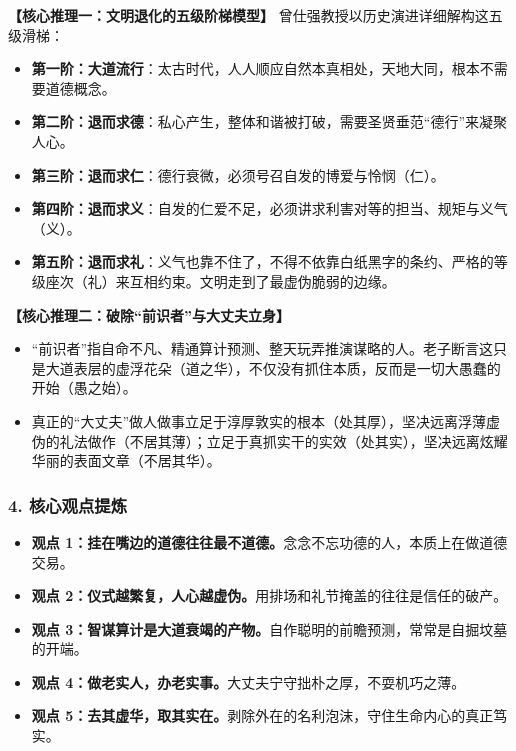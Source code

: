 \noindent\textbf{【核心推理一：文明退化的五级阶梯模型】}
曾仕强教授以历史演进详细解构这五级滑梯：
\begin{itemize}
    \item \textbf{第一阶：大道流行}：太古时代，人人顺应自然本真相处，天地大同，根本不需要道德概念。
    \item \textbf{第二阶：退而求德}：私心产生，整体和谐被打破，需要圣贤垂范“德行”来凝聚人心。
    \item \textbf{第三阶：退而求仁}：德行衰微，必须号召自发的博爱与怜悯（仁）。
    \item \textbf{第四阶：退而求义}：自发的仁爱不足，必须讲求利害对等的担当、规矩与义气（义）。
    \item \textbf{第五阶：退而求礼}：义气也靠不住了，不得不依靠白纸黑字的条约、严格的等级座次（礼）来互相约束。文明走到了最虚伪脆弱的边缘。
\end{itemize}

\noindent\textbf{【核心推理二：破除“前识者”与大丈夫立身】}
\begin{itemize}
    \item “前识者”指自命不凡、精通算计预测、整天玩弄推演谋略的人。老子断言这只是大道表层的虚浮花朵（道之华），不仅没有抓住本质，反而是一切大愚蠢的开始（愚之始）。
    \item 真正的“大丈夫”做人做事立足于淳厚敦实的根本（处其厚），坚决远离浮薄虚伪的礼法做作（不居其薄）；立足于真抓实干的实效（处其实），坚决远离炫耀华丽的表面文章（不居其华）。
\end{itemize}

\subsubsection{4. 核心观点提炼}
\begin{itemize}
    \item \textbf{观点 1：挂在嘴边的道德往往最不道德。}念念不忘功德的人，本质上在做道德交易。
    \item \textbf{观点 2：仪式越繁复，人心越虚伪。}用排场和礼节掩盖的往往是信任的破产。
    \item \textbf{观点 3：智谋算计是大道衰竭的产物。}自作聪明的前瞻预测，常常是自掘坟墓的开端。
    \item \textbf{观点 4：做老实人，办老实事。}大丈夫宁守拙朴之厚，不耍机巧之薄。
    \item \textbf{观点 5：去其虚华，取其实在。}剥除外在的名利泡沫，守住生命内心的真正笃实。
\end{itemize}

